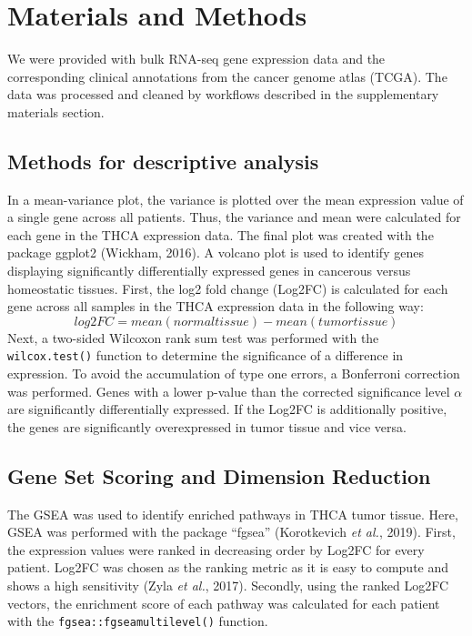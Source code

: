 \documentclass[
  11pt,
  parskip,
  oneside]{scrreprt}
\begin{document}
\hypertarget{materials-and-methods}{%
\chapter{Materials and Methods}\label{materials-and-methods}}

We were provided with bulk RNA-seq gene expression data and the
corresponding clinical annotations from the cancer genome atlas (TCGA).
The data was processed and cleaned by workflows described in the
supplementary materials section.

\hypertarget{methods-for-descriptive-analysis}{%
\section{Methods for descriptive
analysis}\label{methods-for-descriptive-analysis}}

In a mean-variance plot, the variance is plotted over the mean
expression value of a single gene across all patients. Thus, the
variance and mean were calculated for each gene in the THCA expression
data. The final plot was created with the package ggplot2 (Wickham,
2016). A volcano plot is used to identify genes displaying significantly
differentially expressed genes in cancerous versus homeostatic tissues.
First, the log2 fold change (Log2FC) is calculated for each gene across
all samples in the THCA expression data in the following way: \[
log2FC = mean(normal tissue) - mean(tumor tissue)
\]Next, a two-sided Wilcoxon rank sum test was performed with the
\texttt{wilcox.test()} function to determine the significance of a
difference in expression. To avoid the accumulation of type one errors,
a Bonferroni correction was performed. Genes with a lower p-value than
the corrected significance level \(\alpha\) are significantly
differentially expressed. If the Log2FC is additionally positive, the
genes are significantly overexpressed in tumor tissue and vice versa.

\hypertarget{gene-set-scoring-and-dimension-reduction}{%
\section{Gene Set Scoring and Dimension
Reduction}\label{gene-set-scoring-and-dimension-reduction}}

The GSEA was used to identify enriched pathways in THCA tumor tissue.
Here, GSEA was performed with the package ``fgsea'' (Korotkevich
\emph{et al.}, 2019). First, the expression values were ranked in
decreasing order by Log2FC for every patient. Log2FC was chosen as the
ranking metric as it is easy to compute and shows a high sensitivity
(Zyla \emph{et al.}, 2017). Secondly, using the ranked Log2FC vectors,
the enrichment score of each pathway was calculated for each patient
with the \texttt{fgsea::fgseamultilevel()} function.
\end{document}
